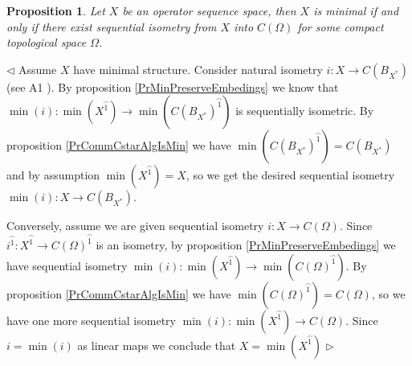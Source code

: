\documentclass[12pt]{article}
\newtheorem{proposition}[theorem]{Proposition}
\newenvironment{proof}{\par $\triangleleft$}{$\triangleright$}
\begin{document}
\begin{proposition}\label{PrMinIsSubspOfCommCstarAlg} Let $X$ be an operator sequence space, then $X$ is minimal if and only if there exist sequential isometry from $X$ into $C(\Omega)$ for some compact topological space $\Omega$.
\end{proposition}
\begin{proof} 
Assume $X$ have minimal structure. Consider natural isometry $i:X\to C(B_{X^*})$ (see A1 \cite{DefFloTensNorOpId}). By proposition \ref{PrMinPreserveEmbedings} we know that $\min(i):\min(X^{\wideparen{1}})\to\min(C(B_{X^*})^{\wideparen{1}})$ is sequentially isometric. By proposition \ref{PrCommCstarAlgIsMin} we have $\min(C(B_{X^*})^{\wideparen{1}})=C(B_{X^*})$ and by assumption $\min(X^{\wideparen{1}})=X$, so we get the desired sequential isometry $\min(i):X\to C(B_{X^*})$.

Conversely, assume we are given sequential isometry $i:X\to C(\Omega)$. Since $i^{\wideparen{1}}:X^{\wideparen{1}}\to C(\Omega)^{\wideparen{1}}$ is an isometry, by proposition \ref{PrMinPreserveEmbedings} we have sequential isometry $\min(i):\min(X^{\wideparen{1}})\to\min(C(\Omega)^{\wideparen{1}})$. By proposition \ref{PrCommCstarAlgIsMin} we have $\min(C(\Omega)^{\wideparen{1}})=C(\Omega)$, so we have one more sequential isometry $\min(i):\min(X^{\wideparen{1}})\to C(\Omega)$. Since $i=\min(i)$ as linear maps we conclude that $X=\min(X^{\wideparen{1}})$ 
\end{proof}
\end{document}
